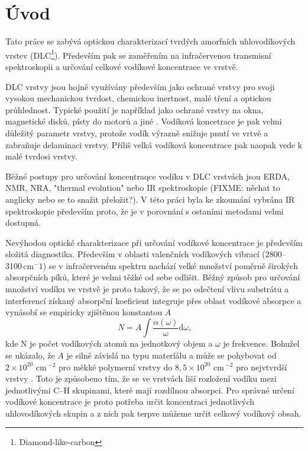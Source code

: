 \chapter{Úvod}
\setcounter{page}{1}

Tato práce se zabývá optickou charakterizací tvrdých amorfních uhlovodíkových vrstev (DLC\footnote{Diamond-like-carbon}). Především pak se zaměřením na infračervenou transmisní spektroskopii a určování celkové vodíkové koncentrace ve vrstvě.

DLC vrstvy jsou hojně využívány především jako ochrané vrstvy pro svoji vysokou mechanickou tvrdost, chemickou inertnost, malé tření a optickou průhlednost. Typické použití je například jako ochrané vrstvy na okna, magnetické disků, písty do motorů a jiné \cite{Robertson2002}.  Vodíková koncetrace je pak velmi důležitý parametr vrstvy, protože vodík výrazně snižuje pnutí ve vrtvě a zabraňuje delaminaci vrstvy. Příliš velká vodíková koncentrace pak naopak vede k malé tvrdosi vrstvy. 

Běžné postupy pro určování koncentraqce vodíku v DLC vrstvách jsou ERDA, NMR, NRA, "thermal evolution" nebo IR spektroskopie \cite{Robertson2002} (FIXME: něchat to anglicky nebo se to snažit přeložit?). V této práci byla ke zkoumání vybrána IR spektroskopie především proto, že je v porovnání s ostaními metodami velmi dostupná. 

Nevýhodou optické charakterizace při určování vodíkové koncentrace je především složitá diagnostika. Především v oblasti valenčních vodíkových vibrací (2800--3100\,cm$^-1$) se v infračerveném spektru nachází velké množství poměrně širokých absorpčních píků, které je velmi těžké od sebe odlišit. Běžný způsob pro určování množství vodíku ve vrstvě je proto takový, že se po odečtení vlivu substrátu a interferencí získaný absorpční koeficient integruje přes oblast vodíkové absorpce a vynásobí se empiricky zjištěnou konstantou $A$
\begin{equation}
N = A \int \frac{\alpha(\omega)}{\omega} \mathrm{d}\omega \text{,}
\end{equation}
kde N je počet vodíkových atomů na jednotkový objem a $\omega$ je frekvence. Bohužel se ukázalo, že $A$ je silně závislá na typu materíálu a může se pohybovat od $2 \times 10^{20}$ cm\,$^{-2}$ pro měkké polymerní vrstvy do $8,5 \times 10^{20}$ cm\,$^{-2}$ pro nejvtvrdší vrstvy \cite{jacob1996}. Toto je způsobeno tím, že se ve vrstvách liší rozložení vodíku mezi jednotlivými C--H skupinami, které mají rozdílnou absorpci. Pro správné určení vodíkové koncentrace je proto potřeba určit koncentraci jednotlivých uhlovodíkových skupin a z nich pak terpve můžeme určit celkový vodíkový obsah. 

